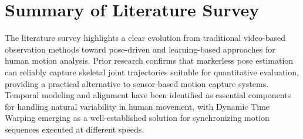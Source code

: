 \documentclass[12pt, a4paper]{report}
\begin{document}
\section{Summary of Literature Survey}
The literature survey highlights a clear evolution from traditional video-based observation methods toward pose-driven and learning-based approaches for human motion analysis. Prior research confirms that markerless pose estimation can reliably capture skeletal joint trajectories suitable for quantitative evaluation, providing a practical alternative to sensor-based motion capture systems. Temporal modeling and alignment have been identified as essential components for handling natural variability in human movement, with Dynamic Time Warping emerging as a well-established solution for synchronizing motion sequences executed at different speeds.






 
\end{document}
